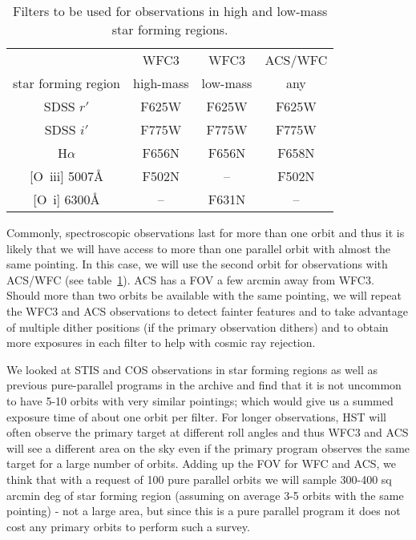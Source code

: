 \documentclass[12pt]{article}
\begin{document}
\begin{table}[htbp]
    \centering
    \begin{tabular}{c|ccc}
    \hline\hline
           & WFC3 & WFC3 & ACS/WFC \\
        star forming region & high-mass & low-mass & any\\
        \hline
        SDSS $r'$ & F625W & F625W & F625W \\
        SDSS $i'$ & F775W & F775W & F775W\\
        H$\alpha$ & F656N & F656N & F658N\\{}
        [O~{\sc iii}] 5007\AA{} & F502N & -- & F502N\\{}
        [O~{\sc i}] 6300\AA{}& -- & F631N & -- \\
        \hline
    \end{tabular}
    \caption{Filters to be used for observations in high and low-mass star forming regions.}
    \label{tab:setup}
\end{table}


Commonly, spectroscopic observations last for more than one orbit and thus it is likely that we will have access to more than one parallel orbit with almost the same pointing. In this case, we will use the second orbit for observations with ACS/WFC (see table~\ref{tab:setup}). ACS has a FOV a few arcmin away from WFC3. Should more than two orbits be available with the same pointing, we will repeat the WFC3 and ACS observations to detect fainter features and to take advantage of multiple dither positions (if the primary observation dithers) and to obtain more exposures in each filter to help with cosmic ray rejection. 

We looked at STIS and COS observations in star forming regions as well as previous pure-parallel programs in the archive and find that it is not uncommon to have 5-10 orbits with very similar pointings; which would give us a summed exposure time of about one orbit per filter. For longer observations, HST will often observe the primary target at different roll angles and thus WFC3 and ACS will see a different area on the sky even if the primary program observes the same target for a large number of orbits. Adding up the FOV for WFC and ACS, we think that with a request of 100 pure parallel orbits we will sample 300-400 sq arcmin deg of star forming region (assuming on average 3-5 orbits with the same pointing) - not a large area, but since this is a pure parallel program it does not cost any primary orbits to perform such a survey.
\end{document}
